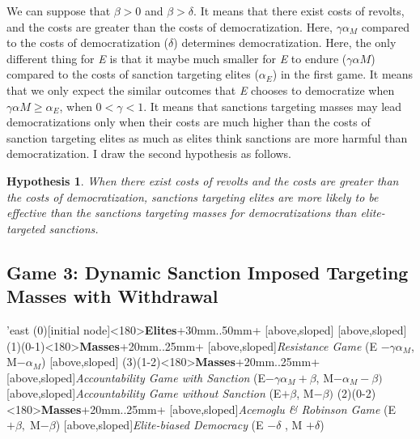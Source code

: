\documentclass[11pt, letterpage]{article}
\newtheorem{hyp}{Hypothesis}
\begin{document}
We can suppose that $\beta > 0$ and $\beta > \delta$. It means that there exist costs of revolts, and the costs are greater than the costs of democratization. Here, $\gamma\alpha_{M}$ compared to the costs of democratization ($\delta$) determines democratization. Here, the only different thing for \textit{E} is that it maybe much smaller for \textit{E} to endure ($\gamma\alpha{M}$) compared to the costs of sanction targeting elites ($\alpha_{E}$) in the first game. It means that we only expect the similar outcomes that \textit{E} chooses to democratize when $\gamma\alpha{M} \geq \alpha_{E}$, when $0 < \gamma < 1$. It means that sanctions targeting masses may  lead democratizations only when their costs are much higher than the costs of sanction targeting elites as much as elites think sanctions are more harmful than democratization. I draw the second hypothesis as follows.



\begin{hyp}
\label{hyp2}
	When there exist costs of revolts and the costs are greater than the costs of democratization, sanctions targeting elites are more likely to be effective than the sanctions targeting masses for democratizations than elite-targeted sanctions.
\end{hyp}

\subsection*{Game 3: Dynamic Sanction Imposed Targeting Masses with Withdrawal}
\begin{center}
\begin{istgame}[font=\footnotesize]
	\centering
	\setistgrowdirection'{east}
	\xtShowArrows
	\istroot(0)[initial node]<180>{\textbf{Elites}}+30mm..50mm+
	[above,sloped]  [above,sloped] \endist
	\istroot(1)(0-1)<180>{\textbf{Masses}}+20mm..25mm+
	[above,sloped]{\textit{Resistance Game} (E $- \gamma\alpha_{M}$, M$-\alpha_{M}$) }
	[above,sloped]{ }  \endist
	\istroot(3)(1-2)<180>{\textbf{Masses}}+20mm..25mm+
	[above,sloped]{\textit{Accountability Game with Sanction}
		 (E$-\gamma\alpha_{M}+\beta$, M$-\alpha_{M}-\beta)$}
	[above,sloped]{\textit{Accountability Game without Sanction} 
		(E$+\beta$, M$-\beta)$} \endist
	\istroot(2)(0-2)<180>{\textbf{Masses}}+20mm..25mm+
	[above,sloped]{\textit{Acemoglu \& Robinson Game} (E $+ \beta,\; $M$-\beta$)}
	[above,sloped]{\textit{Elite-biased Democracy} (E $-\delta$ , M $+ \delta$)} \endist
\end{istgame}
\end{center}	
\end{document}
